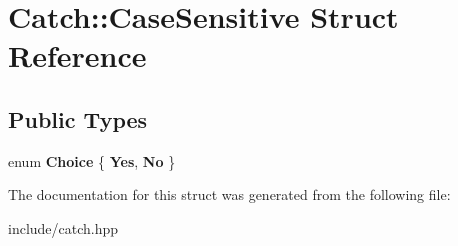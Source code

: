 \hypertarget{structCatch_1_1CaseSensitive}{}\section{Catch\+:\+:Case\+Sensitive Struct Reference}
\label{structCatch_1_1CaseSensitive}
\subsection*{Public Types}
\begin{DoxyCompactItemize}
\item 
enum {\bfseries Choice} \{ {\bfseries Yes}, 
{\bfseries No}
 \}\hypertarget{structCatch_1_1CaseSensitive_aad49d3aee2d97066642fffa919685c6a}{}\label{structCatch_1_1CaseSensitive_aad49d3aee2d97066642fffa919685c6a}

\end{DoxyCompactItemize}


The documentation for this struct was generated from the following file\+:\begin{DoxyCompactItemize}
\item 
include/catch.\+hpp\end{DoxyCompactItemize}
